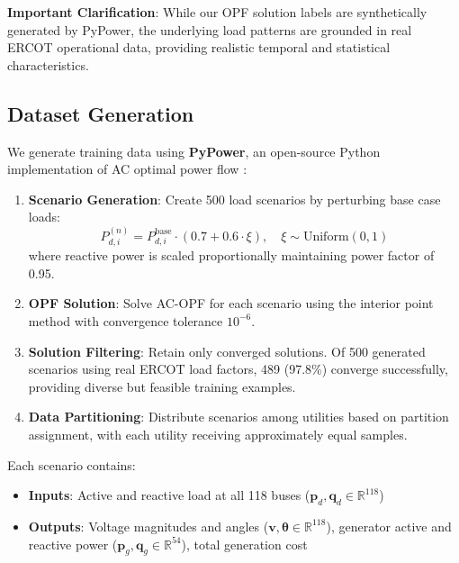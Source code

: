 \documentclass[journal,10pt]{IEEEtran}
\begin{document}
\textbf{Important Clarification}: While our OPF solution labels are synthetically generated by PyPower, the underlying load patterns are grounded in real ERCOT operational data, providing realistic temporal and statistical characteristics.

\subsection{Dataset Generation}

We generate training data using \textbf{PyPower}, an open-source Python implementation of AC optimal power flow \cite{zimmerman2011matpower}:

\begin{enumerate}
    \item \textbf{Scenario Generation}: Create 500 load scenarios by perturbing base case loads:
    \begin{equation}
    P_{d,i}^{(n)} = P_{d,i}^{\text{base}} \cdot (0.7 + 0.6 \cdot \xi), \quad \xi \sim \text{Uniform}(0,1)
    \end{equation}
    where reactive power is scaled proportionally maintaining power factor of 0.95.
    
    \item \textbf{OPF Solution}: Solve AC-OPF for each scenario using the interior point method with convergence tolerance $10^{-6}$.
    
    \item \textbf{Solution Filtering}: Retain only converged solutions. Of 500 generated scenarios using real ERCOT load factors, 489 (97.8\%) converge successfully, providing diverse but feasible training examples.
    
    \item \textbf{Data Partitioning}: Distribute scenarios among utilities based on partition assignment, with each utility receiving approximately equal samples.
\end{enumerate}

Each scenario contains:
\begin{itemize}
    \item \textbf{Inputs}: Active and reactive load at all 118 buses ($\mathbf{p}_d, \mathbf{q}_d \in \mathbb{R}^{118}$)
    \item \textbf{Outputs}: Voltage magnitudes and angles ($\mathbf{v}, \boldsymbol{\theta} \in \mathbb{R}^{118}$), generator active and reactive power ($\mathbf{p}_g, \mathbf{q}_g \in \mathbb{R}^{54}$), total generation cost
\end{itemize}
\end{document}
